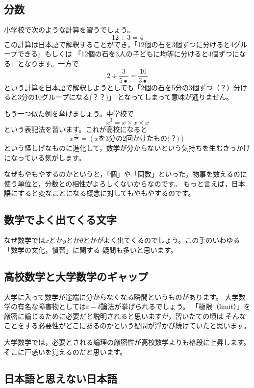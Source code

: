 \documentclass[./main]{subfiles}
\begin{document}
\subsection{分数}

小学校で次のような計算を習うでしょう。
\[
12 \div 3 = 4
\]
この計算は日本語で解釈することができ，「12個の石を3個ずつに分けると4グループできる」もしくは
「12個の石を3人の子どもに均等に分けると4個ずつになる」となります。一方で
\[
2 \div \frac{3}{5•} = \frac{10}{3•}
\]
という計算を日本語で解釈しようとしても「2個の石を5分の3個ずつ（？）分けると3分の10グループになる(？？)」
となってしまって意味が通りません。

もう一つ似た例を挙げましょう。中学校で
\[
x^3 = x \times x \times x 
\]
という表記法を習います。これが高校になると
\[
x^{\frac{2}{3•}} = (x\text{を3分の2回かけたもの(？)})
\]
という怪しげなものに進化して，数学が分からないという気持ちを生むきっかけになっている気がします。

なぜもやもやするのかというと，「個」や「回数」といった，物事を数えるのに使う単位と，分数との相性がよろしくないからなのです。
もっと言えば，日本語にすると変なことになる概念に対してもやもやするのです。

\subsection{数学でよく出てくる文字}

なぜ数学では$x$とか$y$とか$\theta$とかがよく出てくるのでしょう。この手のいわゆる「数学の文化，慣習」に関する
疑問も多いと思います。

\subsection{高校数学と大学数学のギャップ}

大学に入って数学が途端に分からなくなる瞬間というものがあります。
大学数学の有名な障害物としては$\varepsilon - \delta$論法が挙げられるでしょう。
「極限（limit）」を厳密に論じるために必要だと説明されると思いますが，習いたての頃は
そんなことをする必要性がどこにあるのかという疑問が浮かび続けていたと思います。

大学数学では，必要とされる論理の厳密性が高校数学よりも格段に上昇します。そこに戸惑いを覚えるのだと思います。

\subsection{日本語と思えない日本語}
\end{document}
